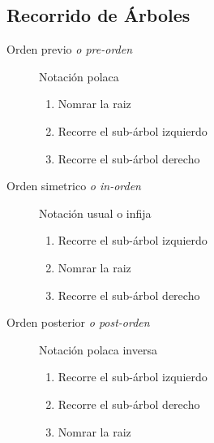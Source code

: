 \documentclass[a4paper,twocolumn]{article}
\numberwithin{equation}{section}
\numberwithin{figure}{section}
\numberwithin{table}{section}
\begin{document}
\subsection{Recorrido de \'Arboles}
\begin{description}
    \item[Orden previo \emph{o pre-orden}] Notaci\'on polaca
		\begin{enumerate}
      		\item Nomrar la raiz
      		\item Recorre el sub-\'arbol izquierdo
            \item Recorre el sub-\'arbol derecho
    	\end{enumerate}
    \item[Orden simetrico \emph{o in-orden}] Notaci\'on usual o infija
		\begin{enumerate}
      		\item Recorre el sub-\'arbol izquierdo
            \item Nomrar la raiz
            \item Recorre el sub-\'arbol derecho
    	\end{enumerate}
    \item[Orden posterior \emph{o post-orden}] Notaci\'on polaca inversa
		\begin{enumerate}
      		\item Recorre el sub-\'arbol izquierdo
            \item Recorre el sub-\'arbol derecho
            \item Nomrar la raiz
    	\end{enumerate}
\end{description}
\end{document}
